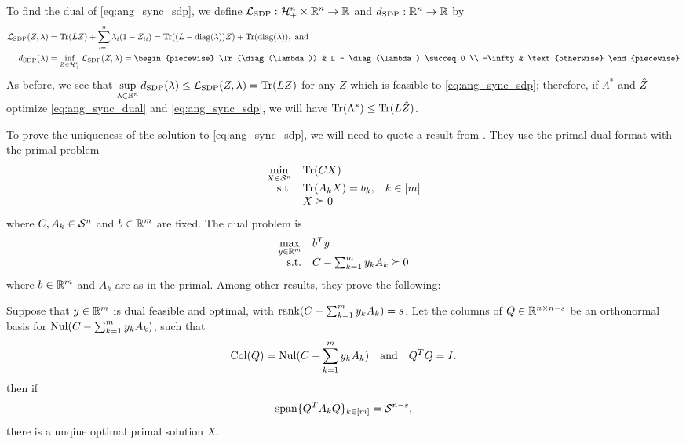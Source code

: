To find the dual of \eqref{eq:ang_sync_sdp}, we define $\mathcal{L}_{\operatorname{SDP}} : \mathcal{H}_+^n \times \mathbb{R}^n \to \mathbb{R}$ and $d_{\operatorname{SDP}} : \mathbb{R}^n \to \mathbb{R}$ by
\begin{align*}
  \Lc_{\SDP}(Z, \lambda) &= \Tr(LZ) + \sum_{i = 1}^n \lambda_i(1 - Z_{ii}) = \Tr((L - \diag(\lambda)) Z) + \Tr(\diag(\lambda)), \ \text{and} \\
  d_{\SDP}(\lambda) &= \inf_{Z \in \H^n_+} \Lc_{\SDP}(Z, \lambda) = \begin{piecewise} \Tr(\diag(\lambda)) & L - \diag(\lambda) \succeq 0 \\ -\infty & \text{otherwise} \end{piecewise}
\end{align*}
As before, we see that $\sup\limits_{\lambda \in \mathbb{R}^n} d_{\operatorname{SDP}}(\lambda) \le \mathcal{L}_{\operatorname{SDP}}(Z, \lambda) = \operatorname{Tr}(LZ)$ for any $Z$ which is feasible to \eqref{eq:ang_sync_sdp}; therefore, if $\Lambda^*$ and $\hat{Z}$ optimize \eqref{eq:ang_sync_dual} and \eqref{eq:ang_sync_sdp}, we will have $\operatorname{Tr}(\Lambda^*) \le \operatorname{Tr}(L\hat{Z})$.

To prove the uniqueness of the solution to \eqref{eq:ang_sync_sdp}, we will need to quote a result from \cite{alizadeh1997nondegeneracy}.  They use the primal-dual format with the primal problem
\begin{equation}
  \begin{array}{rlc}
    \displaystyle \min_{X \in \mathcal{S}^n} & \operatorname{Tr}(C X) \\
    \text{s.t.} & \operatorname{Tr}(A_k X) = b_k, & k \in [m] \\
    & X \succeq 0
  \end{array} \label{eq:alizadeh_primal}
\end{equation}
where $C, A_k \in \mathcal{S}^n$ and $b \in \mathbb{R}^m$ are fixed.  The dual problem is
\begin{equation}
  \begin{array}{rl}
    \displaystyle\max_{y \in \mathbb{R}^m} & b^T y \\
    \text{s.t.} & C - \sum_{k = 1}^m y_k A_k \succeq 0
  \end{array} \label{eq:alizadeh_dual}
\end{equation}
where $b \in \mathbb{R}^m$ and $A_k$ are as in the primal.  Among other results, they prove the following:

\begin{proposition}
  Suppose that $y \in \mathbb{R}^m$ is dual feasible and optimal, with $\operatorname{rank}(C - \sum_{k = 1}^m y_k A_k) = s$.  Let the columns of $Q \in \mathbb{R}^{n \times n - s}$ be an orthonormal basis for $\operatorname{Nul}(C - \sum_{k = 1}^m y_k A_k)$, such that  \[\operatorname{Col}(Q) = \operatorname{Nul}(C - \sum_{k = 1}^m y_k A_k) \quad \text{and} \quad Q^T Q = I.\] then if \begin{equation} \operatorname{span} \{Q^T A_k Q\}_{k \in [m]} = \mathcal{S}^{n - s} \label{eq:dual_nondegen},\end{equation} there is a unqiue optimal primal solution $X$. \label{prop:primal_unique}
\end{proposition}

